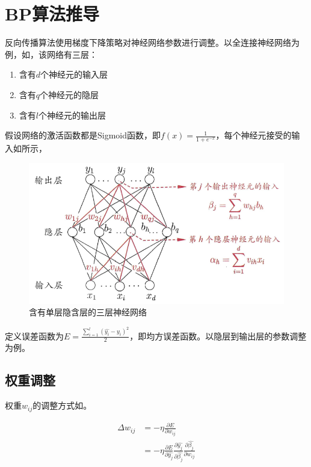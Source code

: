 
\section{BP算法推导}

反向传播算法使用梯度下降策略对神经网络参数进行调整。以全连接神经网络为例，如，该网络有三层：

\begin{enumerate}
\item 含有$d$个神经元的输入层
\item 含有$q$个神经元的隐层
\item 含有$l$个神经元的输出层
\end{enumerate}

假设网络的激活函数都是Sigmoid函数，即$f(x)=\frac{1}{1+e^{-x}}$，每个神经元接受的输入如所示，

\begin{figure}[tbph]
\centering
\includegraphics[width=0.75\linewidth]{.asserts/nn-module-complete}
\caption{含有单层隐含层的三层神经网络}
\label{fig:nn-module-complete}
\end{figure}

定义误差函数为$E=\frac{\sum_{i=1}^{l}{(\hat{y_i} - y_i)^2}}{2}$，即均方误差函数。以隐层到输出层的参数调整为例。

\subsection{权重调整}

权重$w_{ij}$的调整方式如。

\begin{equation}\label{eq:update-w}
\begin{aligned}
\Delta w_{ij} &= -\eta \frac{\partial E}{\partial w_{ij}} \\
&= -\eta \frac{\partial E}{\partial \hat{y_j}} \frac{\partial \hat{y_j}}{\partial \hat{\beta_j}} \frac{\partial \hat{\beta_j}}{\partial w_{ij}}
\end{aligned}
\end{equation}

